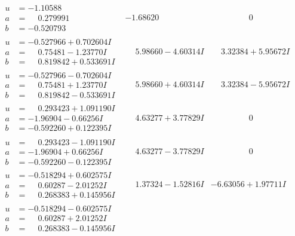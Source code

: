 \documentclass[1p]{elsarticle_modified}
\theoremstyle{definition}
\begin{document}
$$\begin{array}{c|c|c}
\begin{aligned}
u &= -1.10588\phantom{ +0.000000I} \\
a &= \phantom{-}0.279991\phantom{ +0.000000I} \\
b &= -0.520793\phantom{ +0.000000I}\end{aligned}
 & -1.68620\phantom{ +0.000000I} & \phantom{-0.000000 } 0 \\ \hline\begin{aligned}
u &= -0.527966 + 0.702604 I \\
a &= \phantom{-}0.75481 - 1.23770 I \\
b &= \phantom{-}0.819842 + 0.533691 I\end{aligned}
 & \phantom{-}5.98660 - 4.60314 I & \phantom{-}3.32384 + 5.95672 I \\ \hline\begin{aligned}
u &= -0.527966 - 0.702604 I \\
a &= \phantom{-}0.75481 + 1.23770 I \\
b &= \phantom{-}0.819842 - 0.533691 I\end{aligned}
 & \phantom{-}5.98660 + 4.60314 I & \phantom{-}3.32384 - 5.95672 I \\ \hline\begin{aligned}
u &= \phantom{-}0.293423 + 1.091190 I \\
a &= -1.96904 - 0.66256 I \\
b &= -0.592260 + 0.122395 I\end{aligned}
 & \phantom{-}4.63277 + 3.77829 I & \phantom{-0.000000 } 0 \\ \hline\begin{aligned}
u &= \phantom{-}0.293423 - 1.091190 I \\
a &= -1.96904 + 0.66256 I \\
b &= -0.592260 - 0.122395 I\end{aligned}
 & \phantom{-}4.63277 - 3.77829 I & \phantom{-0.000000 } 0 \\ \hline\begin{aligned}
u &= -0.518294 + 0.602575 I \\
a &= \phantom{-}0.60287 - 2.01252 I \\
b &= \phantom{-}0.268383 + 0.145956 I\end{aligned}
 & \phantom{-}1.37324 - 1.52816 I & -6.63056 + 1.97711 I \\ \hline\begin{aligned}
u &= -0.518294 - 0.602575 I \\
a &= \phantom{-}0.60287 + 2.01252 I \\
b &= \phantom{-}0.268383 - 0.145956 I\end{aligned}

\end{array}$$
\end{document}
